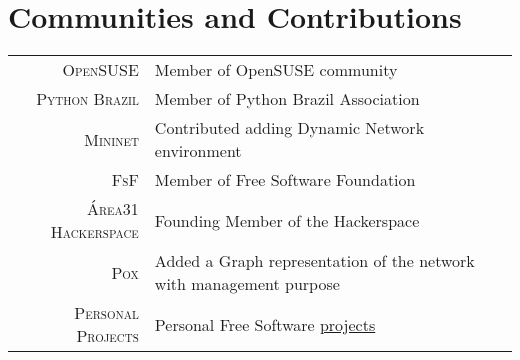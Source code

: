 \documentclass[a4paper,10pt]{article} %
\begin{document}

\section{Communities and Contributions}

\begin{tabular}{rl}
\textsc{OpenSUSE}  & Member of OpenSUSE community \\
\textsc{Python Brazil}  & Member of Python Brazil Association \\
\textsc{Mininet}  & Contributed adding Dynamic Network environment \\
\textsc{FsF} & Member of Free Software Foundation \\
\textsc{Área31 Hackerspace} & Founding Member of the Hackerspace \\
\textsc{Pox} & Added a Graph representation of the network with 
management purpose \\
\textsc{Personal Projects} & Personal Free Software
\href{http://github.com/pantuza}{projects} \\
\end{tabular}












\end{document}

